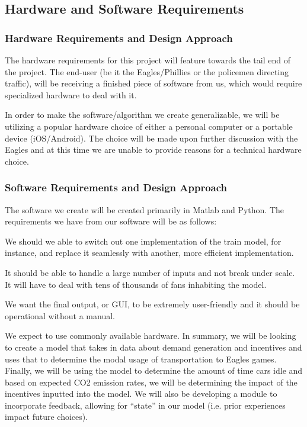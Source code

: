 \documentclass[12pt]{article}
\begin{document}
\subsection{Hardware and Software Requirements}
\subsubsection{Hardware Requirements and Design Approach}
The hardware requirements for this project will feature towards the
tail end of the project.  The end-user (be it the Eagles/Phillies or
the policemen directing traffic), will be receiving a finished piece of
software from us, which would require specialized hardware to deal
with it.

In order to make the software/algorithm we create generalizable, we
will be utilizing a popular hardware choice of either a personal
computer or a portable device (iOS/Android). The choice will be made
upon further discussion with the Eagles and at this time we are unable
to provide reasons for a technical hardware choice.

\subsubsection{ Software Requirements and Design Approach}
The software we create will be created primarily in Matlab and
Python. The requirements we have from our software will be as follows:
\label{requirements}
\begin{description}[style=nextline]
    \item[Modularity] We should we able to switch out one
  implementation of the train model, for instance, and replace it
  seamlessly with another, more efficient implementation.
    \item[Scalability] It should be able to handle a large number of
  inputs and not break under scale. It will have to deal with tens of
  thousands of fans inhabiting the model.
    \item[User-Friendliness] We want the final output, or GUI, to be
  extremely user-friendly and it should be operational without a
  manual.
\end{description}

We expect to use commonly available hardware. In summary, we will be
looking to create a model that takes in data about demand generation
and incentives and uses that to determine the modal usage of
transportation to Eagles games.  Finally, we will be using the model
to determine the amount of time cars idle and based on expected CO2
emission rates, we will be determining the impact of the incentives
inputted into the model. We will also be developing a module to
incorporate feedback, allowing for ``state'' in our model (i.e. prior
experiences impact future choices).
\end{document}
